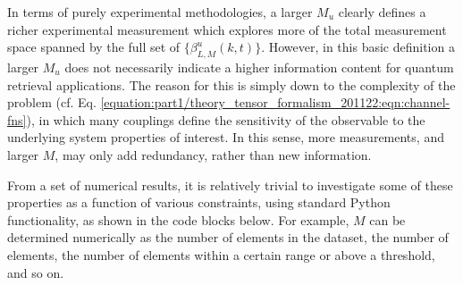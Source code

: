 \documentclass[letterpaper,table,10pt,english]{jupyterBook}
\begin{document}
\sphinxAtStartPar
In terms of purely experimental methodologies, a larger \(M_{u}\) clearly
defines a richer experimental measurement which explores more of the
total measurement space spanned by the full set of
\(\{\beta_{L,M}^{u}(k,t)\}\). However, in this basic definition a larger
\(M_{u}\) does not necessarily indicate a higher information content for
quantum retrieval applications. The reason for this is simply down to
the complexity of the problem (cf. Eq. \eqref{equation:part1/theory_tensor_formalism_201122:eqn:channel-fns}), in which many couplings define the sensitivity of the observable to the underlying system properties of
interest. In this sense, more measurements, and larger \(M\), may only add
redundancy, rather than new information.

\sphinxAtStartPar
From a set of numerical results, it is relatively trivial to investigate some of these properties as a function of various constraints, using standard Python functionality, as shown in the code blocks below. For example, \(M\) can be determined numerically as the number of elements in the dataset, the number of  elements, the number of elements within a certain range or above a threshold, and so on.
\end{document}
